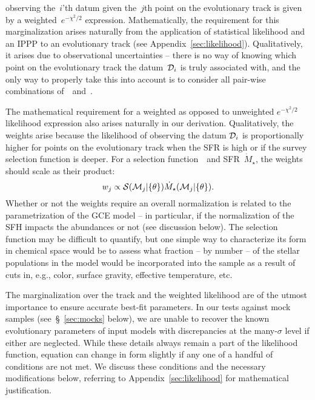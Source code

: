 \documentclass[ms.tex]{subfiles}
\begin{document}
observing the~$i$'th datum given the~$j$th point on the evolutionary track is
given by a weighted~$e^{-\chi^2/2}$ expression.
Mathematically, the requirement for this marginalization arises naturally from
the application of statistical likelihood and an IPPP to an evolutionary track
(see Appendix~\ref{sec:likelihood}).
Qualitatively, it arises due to observational uncertainties -- there is no way
of knowing which point on the evolutionary track the datum~$\mathcal{D}_i$ is
truly associated with, and the only way to properly take this into account is
to consider all pair-wise combinations of~~and~.
\par
The mathematical requirement for a weighted as opposed to unweighted
$e^{-\chi^2/2}$ likelihood expression also arises naturally in our derivation.
Qualitatively, the weights arise because the likelihood of observing the datum
$\mathcal{D}_i$ is proportionally higher for points on the evolutionary track
when the SFR is high or if the survey selection function is deeper.
For a selection function~~and SFR~$\dot{M}_\star$, the weights should
scale as their product:
\begin{equation}
w_j \propto \mathcal{S}(\mathcal{M}_j | \{\theta\})
\dot{M}_\star(\mathcal{M}_j | \{\theta\}).
\label{eq:weights}
\end{equation}
Whether or not the weights require an overall normalization is related to the
parametrization of the GCE model -- in particular, if the normalization of the
SFH impacts the abundances or not (see discussion below).
The selection function may be difficult to quantify, but one simple way to
characterize its form in chemical space would be to assess what fraction -- by
number -- of the stellar populations in the model would be incorporated into
the sample as a result of cuts in, e.g., color, surface gravity, effective
temperature, etc.
\par
The marginalization over the track and the weighted likelihood are of the
utmost importance to ensure accurate best-fit parameters.
In our tests against mock samples (see~\S~\ref{sec:mocks} below), we are unable
to recover the known evolutionary parameters of input models with discrepancies
at the many-$\sigma$ level if either are neglected.
While these details always remain a part of the likelihood function, equation
 can change in form slightly if any one of a handful of
conditions are not met.
We discuss these conditions and the necessary modifications below, referring to
Appendix~\ref{sec:likelihood} for mathematical justification.
\end{document}
